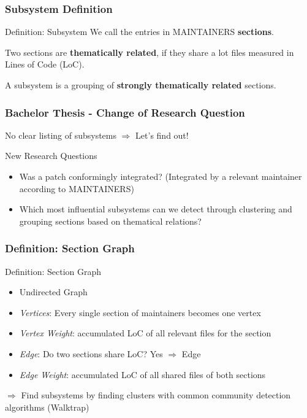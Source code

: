 \documentclass{beamer}
\begin{document}
	\begin{frame} %
	\frametitle{Subsystem Definition}
		\begin{block}{Definition: Subsystem}
			We call the entries in MAINTAINERS \textbf{sections}.

			Two sections are \textbf{thematically related}, if they share a lot files measured in Lines of Code (LoC).

			A subsystem is a grouping of \textbf{strongly thematically related} sections.
		\end{block}
	\end{frame}

	\begin{frame}
	\frametitle{Bachelor Thesis - Change of Research Question}
		\begin{block}{No clear listing of subsystems}
			$\Rightarrow$ Let's find out!
		\end{block}

		\begin{block}{New Research Questions}
			\begin{itemize}
				\item Was a patch conformingly integrated? (Integrated by a relevant maintainer according to MAINTAINERS)
				\item Which most influential subsystems can we detect through clustering and grouping sections based on thematical relations?
			\end{itemize}
		\end{block}
	\end{frame}


	\begin{frame}
	\frametitle{Definition: Section Graph}
		\begin{alertblock}{Definition: Section Graph}
			\begin{itemize}
				\item Undirected Graph
				\item \textit{Vertices}: Every single section of maintainers becomes one vertex
				\item \textit{Vertex Weight}: accumulated LoC of all relevant files for the section
				\item \textit{Edge}: Do two sections share LoC? Yes $\Rightarrow$ Edge
				\item \textit{Edge Weight}: accumulated LoC of all shared files of both sections
			\end{itemize}
		\end{alertblock}

		$\Rightarrow$ Find subsystems by finding clusters with common community detection algorithms (Walktrap) %
	\end{frame}
\end{document}
